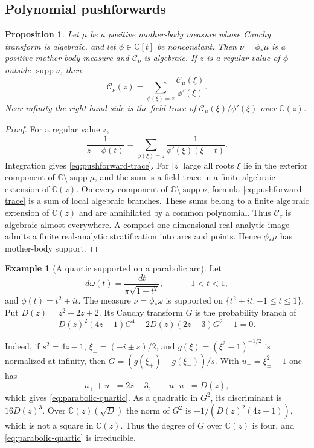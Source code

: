\documentclass[reqno]{amsart}
\newtheorem{proposition}[theorem]{Proposition}
\theoremstyle{definition}
\newtheorem{example}[theorem]{Example}
\theoremstyle{remark}
\newcommand{\bC}{\mathbb C}
\newcommand{\Cauchy}{\mathcal C}
\newcommand{\supp}{\operatorname{supp}}
\begin{document}
\subsection{Polynomial pushforwards}

\begin{proposition}\label{prop:pushforward}
Let $\mu$ be a positive mother-body measure whose Cauchy transform is algebraic,
and let $\phi\in\bC[t]$ be nonconstant.  Then $\nu=\phi_*\mu$ is a positive
mother-body measure and $\Cauchy_\nu$ is algebraic.  If $z$ is a regular value of
$\phi$ outside $\supp\nu$, then
\begin{equation}\label{eq:pushforward-trace}
 \Cauchy_\nu(z)=
 \sum_{\phi(\xi)=z}\frac{\Cauchy_\mu(\xi)}{\phi'(\xi)}.
\end{equation}
Near infinity the right-hand side is the field trace of
$\Cauchy_\mu(\xi)/\phi'(\xi)$ over $\bC(z)$.
\end{proposition}

\begin{proof}
For a regular value $z$,
\[
 \frac1{z-\phi(t)}=
 \sum_{\phi(\xi)=z}\frac1{\phi'(\xi)(\xi-t)}.
\]
Integration gives \eqref{eq:pushforward-trace}.  For $|z|$ large all roots $\xi$ lie in the exterior component of
$\bC\setminus\supp\mu$, and the sum is a field trace in a finite algebraic
extension of $\bC(z)$.  On every component of $\bC\setminus\supp\nu$, formula
\eqref{eq:pushforward-trace} is a sum of local algebraic branches.  These sums
belong to a finite algebraic extension of $\bC(z)$ and are annihilated by a
common polynomial.  Thus $\Cauchy_\nu$ is algebraic almost everywhere.  A compact
one-dimensional real-analytic image admits a finite real-analytic
stratification into arcs and points.  Hence $\phi_*\mu$ has mother-body
support.
\end{proof}

\begin{example}[A quartic supported on a parabolic arc]
\label{ex:parabolic-pushforward}
Let
\[
 d\omega(t)=\frac{dt}{\pi\sqrt{1-t^2}},\qquad -1<t<1,
\]
and $\phi(t)=t^2+it$.  The measure $\nu=\phi_*\omega$ is supported on
$\{t^2+it:-1\le t\le1\}$.  Put $D(z)=z^2-2z+2$.  Its Cauchy transform $G$ is the
probability branch of
\begin{equation}\label{eq:parabolic-quartic}
 D(z)^2(4z-1)G^4-2D(z)(2z-3)G^2-1=0.
\end{equation}

Indeed, if $s^2=4z-1$, $\xi_\pm=(-i\pm s)/2$, and
$g(\xi)=(\xi^2-1)^{-1/2}$ is normalized at infinity, then
$G=(g(\xi_+)-g(\xi_-))/s$.  With $u_\pm=\xi_\pm^2-1$ one has
\[
 u_++u_-=2z-3,
 \qquad u_+u_-=D(z),
\]
which gives \eqref{eq:parabolic-quartic}.  As a quadratic in $G^2$, its
discriminant is $16D(z)^3$.  Over $\bC(z)(\sqrt D)$ the norm of $G^2$ is
$-1/(D(z)^2(4z-1))$, which is not a square in $\bC(z)$.  Thus the degree of $G$
over $\bC(z)$ is four, and \eqref{eq:parabolic-quartic} is irreducible.
\end{example}
\end{document}
